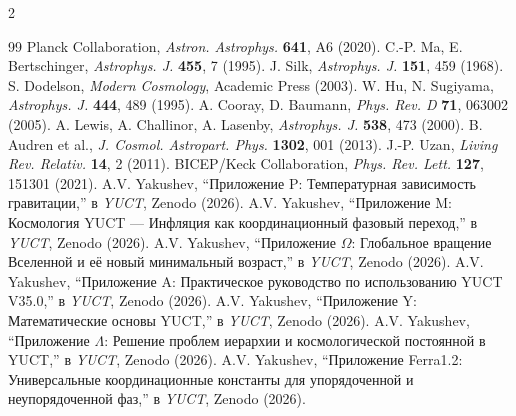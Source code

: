 \documentclass[11pt,a4paper]{article}
\begin{document}
\begin{multicols}{2}
		\begin{thebibliography}{99}
			 Planck Collaboration, \emph{Astron. Astrophys.} \textbf{641}, A6 (2020).
			 C.-P. Ma, E. Bertschinger, \emph{Astrophys. J.} \textbf{455}, 7 (1995).
			 J. Silk, \emph{Astrophys. J.} \textbf{151}, 459 (1968).
			 S. Dodelson, \emph{Modern Cosmology}, Academic Press (2003).
			 W. Hu, N. Sugiyama, \emph{Astrophys. J.} \textbf{444}, 489 (1995).
			 A. Cooray, D. Baumann, \emph{Phys. Rev. D} \textbf{71}, 063002 (2005).
			 A. Lewis, A. Challinor, A. Lasenby, \emph{Astrophys. J.} \textbf{538}, 473 (2000).
			 B. Audren et al., \emph{J. Cosmol. Astropart. Phys.} \textbf{1302}, 001 (2013).
			 J.-P. Uzan, \emph{Living Rev. Relativ.} \textbf{14}, 2 (2011).
			 BICEP/Keck Collaboration, \emph{Phys. Rev. Lett.} \textbf{127}, 151301 (2021).
			 A.V. Yakushev, ``Приложение P: Температурная зависимость гравитации,'' в \emph{YUCT}, Zenodo (2026).
			 A.V. Yakushev, ``Приложение M: Космология YUCT — Инфляция как координационный фазовый переход,'' в \emph{YUCT}, Zenodo (2026).
			 A.V. Yakushev, ``Приложение $\Omega$: Глобальное вращение Вселенной и её новый минимальный возраст,'' в \emph{YUCT}, Zenodo (2026).
			 A.V. Yakushev, ``Приложение A: Практическое руководство по использованию YUCT V35.0,'' в \emph{YUCT}, Zenodo (2026).
			 A.V. Yakushev, ``Приложение Y: Математические основы YUCT,'' в \emph{YUCT}, Zenodo (2026).
			 A.V. Yakushev, ``Приложение $\Lambda$: Решение проблем иерархии и космологической постоянной в YUCT,'' в \emph{YUCT}, Zenodo (2026).
			 A.V. Yakushev, ``Приложение Ferra1.2: Универсальные координационные константы для упорядоченной и неупорядоченной фаз,'' в \emph{YUCT}, Zenodo (2026).
		\end{thebibliography}
		
	\end{multicols}
\end{document}
